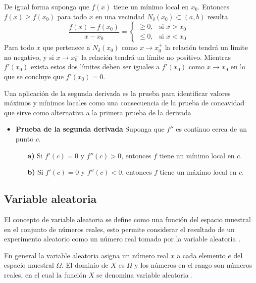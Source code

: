 De igual forma suponga que $f(x)$ tiene un mínimo local en ${x}_{0}$. Entonces $f(x) \geq f({x}_{0})$ para todo $x$ en una vecindad ${N}_{\delta}({x}_{0}) \subset (a,b)$ resulta
\begin{equation}
	\frac{f(x)-f({x}_{0})}{x-{x}_{0}} =
	\left\{
	\begin{array}{ll}
		\geq 0, & \text{si } x > {x}_{0} \\
		\leq 0, & \text{si } x < {x}_{0}
	\end{array}
	\right.
\end{equation}
Para todo $x$ que pertenece a ${N}_{\delta}({x}_{0})$ como $x \rightarrow {x}_{0}^{+}$ la relación tendrá un límite no negativo, y si $x \rightarrow {x}_{0}^{-}$ la relación tendrá un límite no positivo. Mientras $f'(x_0)$ exista estos dos límites deben ser iguales a $f'({x}_{0})$ como $x \rightarrow {x}_{0}$ en lo que se concluye que $f'({x}_{0})=0$.

Una aplicación de la segunda derivada es la prueba para identificar valores máximos y mínimos locales como una consecuencia de la prueba de concavidad que sirve como alternativa a la primera prueba de la derivada \citep{stewart2016calculus}

\begin{itemize}
	\item \textbf{Prueba de la segunda derivada} Suponga que $f''$ es continuo cerca de un punto $c$.
	\begin{itemize}
		\item[\textbf{a)}] Si $f'(c)=0$ y $f''(c) > 0$, entonces $f$ tiene un mínimo local en $c$.
		\item[\textbf{b)}] Si $f'(c)=0$ y $f''(c) < 0$, entonces $f$ tiene un máximo local en $c$.
	\end{itemize}
\end{itemize}

\subsection{Variable aleatoria}
El concepto de variable aleatoria se define como una función del espacio muestral en el conjunto de números reales, esto permite considerar el resultado de un experimento aleatorio como un número real tomado por la variable aleatoria \citep{rincon2014introduccion}.

En general la variable aleatoria asigna un número real $x$ a cada elemento $e$ del espacio muestral $\Omega$. El dominio de $X$ es $\Omega$ y los números en el rango son números reales, en el cual la función $X$ se denomina variable aleatoria \citep{hines1988probabilidad}.

